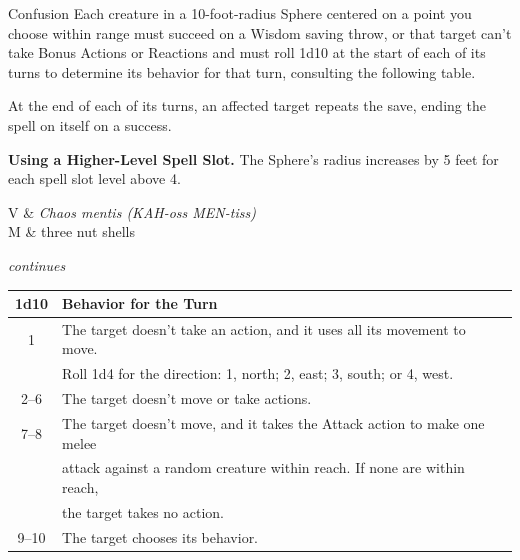 \begin{Spell}[
  tags=Concentration,
  level={4th},
  time={1 action},
  range={90 ft/10 ft r sphere},
  components={V, S, M},
  duration={1 minute},
  school={Enchantment},
  attack={WIS Save},
  effect={Control}
]{Confusion}
Each creature in a 10-foot-radius Sphere centered on a point you choose within range must succeed on a Wisdom saving throw, or that target can't take Bonus Actions or Reactions and must roll 1d10 at the start of each of its turns to determine its behavior for that turn, consulting the following table.

At the end of each of its turns, an affected target repeats the save, ending the spell on itself on a success.

\textbf{Using a Higher-Level Spell Slot.} The Sphere's radius increases by 5 feet for each spell slot level above 4.

\begin{components}
V & \textit{Chaos mentis (KAH-oss MEN-tiss)} \\
M & three nut shells
\end{components}
\hfill \textit{\footnotesize continues}
\newpage
{}
\begin{center}
\begin{tabular}{cl}
\textbf{1d10} & \textbf{Behavior for the Turn} \\ \hline
1 & The target doesn't take an action, and it uses all its movement to move. \\
  & Roll 1d4 for the direction: 1, north; 2, east; 3, south; or 4, west. \\
2--6 & The target doesn't move or take actions. \\
7--8 & The target doesn't move, and it takes the Attack action to make one melee \\
  & attack against a random creature within reach. If none are within reach, \\
  & the target takes no action. \\
9--10 & The target chooses its behavior. \\
\end{tabular}
\end{center}
\end{Spell}


